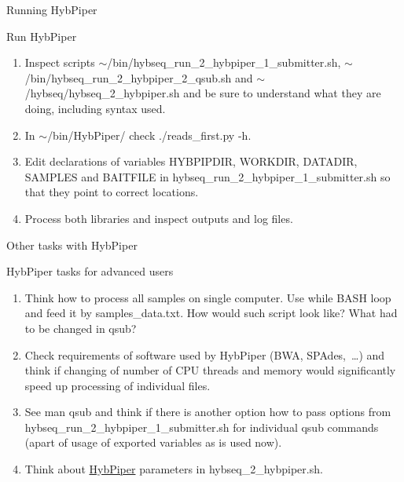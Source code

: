 \documentclass[compress, ucs, xelatex, 11pt, xcolor=x11names, aspectratio=169,
	hyperref={
		bookmarks=true,
		unicode=true,
		colorlinks=true,
		pdftitle={HybSeq course},
		plainpages=false,
		pdfauthor={Vojtech Zeisek},
		pdfsubject={Practical processing of HybSeq target enrichment sequencing data on computing grids like MetaCentrum},
		pdfcreator={XeLaTeX},
		pdfkeywords={BASH, command line, GNU, HybSeq, Linux, MetaCentrum, sequencing shell, target enrichment},
		linkcolor=Turquoise4, %
		anchorcolor=DodgerBlue4, %
		citecolor=DodgerBlue4, %
		filecolor=DodgerBlue4, %
		menucolor=Tan4, %
		urlcolor=DarkOliveGreen4, %
		pdftex},
	url={hyphens, lowtilde} %
	]{beamer}
\renewcommand{\texttt}[1]{\colorbox{Cornsilk2}{{\ttfamily #1}}}
\begin{document}
\begin{frame}{Running HybPiper}
	\begin{exampleblock}{Run HybPiper}
		\begin{enumerate}
			\item Inspect scripts \texttt{$\sim$/bin/hybseq\_run\_2\_hybpiper\_1\_submitter.sh}, \texttt{$\sim$/bin/hybseq\_run\_2\_hybpiper\_2\_qsub.sh} and \texttt{$\sim$/hybseq/hybseq\_2\_hybpiper.sh} and be sure to understand what they are doing, including syntax used.
			\item In \texttt{$\sim$/bin/HybPiper/} check \texttt{./reads\_first.py -h}.
			\item Edit declarations of variables \texttt{HYBPIPDIR}, \texttt{WORKDIR}, \texttt{DATADIR}, \texttt{SAMPLES} and \texttt{BAITFILE} in \texttt{hybseq\_run\_2\_hybpiper\_1\_submitter.sh} so that they point to correct locations.
			\item Process both libraries and inspect outputs and log files.
		\end{enumerate}
	\end{exampleblock}
\end{frame}

\begin{frame}{Other tasks with HybPiper}
	\begin{exampleblock}{HybPiper tasks for advanced users}
		\begin{enumerate}
			\item Think how to process all samples on single computer. Use \texttt{while} BASH loop and feed it by \texttt{samples\_data.txt}. How would such script look like? What had to be changed in \texttt{qsub}?
			\item Check requirements of software used by HybPiper (BWA, SPAdes,~\ldots) and think if changing of number of CPU threads and memory would significantly speed up processing of individual files.
			\item See \texttt{man qsub} and think if there is another option how to pass options from \texttt{hybseq\_run\_2\_hybpiper\_1\_submitter.sh} for individual \texttt{qsub} commands (apart of usage of exported variables as is used now).
			\item Think about \href{https://github.com/mossmatters/HybPiper/wiki}{HybPiper} parameters in \texttt{hybseq\_2\_hybpiper.sh}.
		\end{enumerate}
	\end{exampleblock}
\end{frame}
\end{document}
